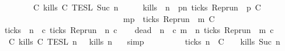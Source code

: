 \begin{isabellebody}
\isanewline
\ \ \ \ \ \ {\isasyminter}\ {\isasymlbrakk}\ C\ kills\ C\ {\isasymrbrakk}\isactrlsub T\isactrlsub E\isactrlsub S\isactrlsub L\isactrlbsup {\isasymge}\ Suc\ n\isactrlesup {\isacartoucheclose}\isanewline
%
\isadelimproof
%
\endisadelimproof
%
\isatagproof
{}\isamarkupfalse%
\ {\isacharminus}\isanewline
\ \ \isamarkupfalse%
\ {\isacharquery}kills\ {\isacharequal}\ {\isacartoucheopen}{\isasymlambda}n\ {\isasymrho}{\isachardot}\ {\isasymforall}p{\isasymge}n{\isachardot}\ ticks\ {\isacharparenleft}{\isacharparenleft}Rep{\isacharunderscore}run\ {\isasymrho}{\isacharparenright}\ p\ C\isanewline
\ \ \ \ \ \ \ \ \ \ \ \ \ \ \ \ \ \ \ \ \ \ \ \ \ \ \ \ \ {\isasymlongrightarrow}\ {\isacharparenleft}{\isasymforall}m{\isasymge}p{\isachardot}\ {\isasymnot}\ ticks\ {\isacharparenleft}{\isacharparenleft}Rep{\isacharunderscore}run\ {\isasymrho}{\isacharparenright}\ m\ C\isanewline
\ \ \isamarkupfalse%
\ {\isacharquery}ticks\ {\isacharequal}\ {\isacartoucheopen}{\isasymlambda}n\ {\isasymrho}\ c{\isachardot}\ ticks\ {\isacharparenleft}{\isacharparenleft}Rep{\isacharunderscore}run\ {\isasymrho}{\isacharparenright}\ n\ c{\isacharparenright}{\isacartoucheclose}\isanewline
\ \ \isamarkupfalse%
\ {\isacharquery}dead\ {\isacharequal}\ {\isacartoucheopen}{\isasymlambda}n\ {\isasymrho}\ c{\isachardot}\ {\isasymforall}m\ {\isasymge}\ n{\isachardot}\ {\isasymnot}ticks\ {\isacharparenleft}{\isacharparenleft}Rep{\isacharunderscore}run\ {\isasymrho}{\isacharparenright}\ m\ c{\isacharparenright}{\isacartoucheclose}\isanewline
\ \ \isamarkupfalse%
\ {\isacartoucheopen}{\isasymlbrakk}\ C\ kills\ C\ {\isasymrbrakk}\isactrlsub T\isactrlsub E\isactrlsub S\isactrlsub L\isactrlbsup {\isasymge}\ n\isactrlesup \ {\isacharequal}\ {\isacharbraceleft}{\isasymrho}{\isachardot}\ {\isacharquery}kills\ n\ {\isasymrho}{\isacharbraceright}{\isacartoucheclose}\ \isamarkupfalse%
\ simp\isanewline
\ \ \isamarkupfalse%
\ \isamarkupfalse%
\ {\isacartoucheopen}{\isachardot}{\isachardot}{\isachardot}\ {\isacharequal}\ {\isacharparenleft}{\isacharbraceleft}{\isasymrho}{\isachardot}\ {\isasymnot}\ {\isacharquery}ticks\ n\ {\isasymrho}\ C\ \ {\isasyminter}\ {\isacharbraceleft}{\isasymrho}{\isachardot}\ {\isacharquery}kills\ {\isacharparenleft}Suc\ n{\isacharparenright}\ {\isasymrho}{\isacharbraceright}{\isacharparenright}\isanewline

\end{isabellebody}
